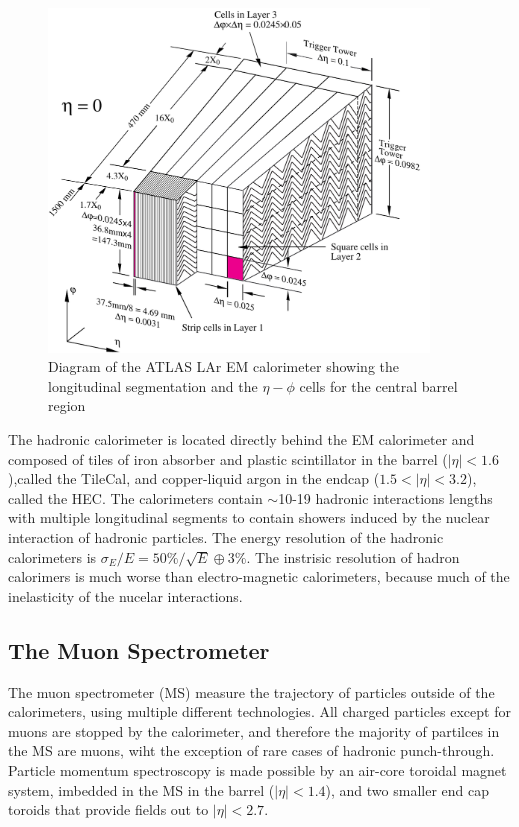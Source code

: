 \begin{figure}[!t]
\centering 
\includegraphics[width=0.9\textwidth]{figs/lhc/LARG3-TDR-barrelM-eps-converted-to}
\caption{Diagram of the ATLAS  LAr EM calorimeter showing the longitudinal segmentation and the $\eta-\phi$ cells for the central barrel region}
\label{figure:lhc_calo_em}
\end{figure}




The hadronic calorimeter is located directly behind the EM calorimeter and composed of tiles of iron absorber and plastic scintillator  in the barrel ($|\eta| < 1.6$),called the TileCal,  and copper-liquid argon in the endcap ($1.5<|\eta| <3.2$), called the HEC. The calorimeters contain $\sim$10-19 hadronic interactions lengths with multiple longitudinal segments to contain showers induced by the nuclear interaction of hadronic particles. The energy resolution of the hadronic calorimeters is $\sigma_E/E = 50\%/\sqrt{E}\oplus3\%$. The instrisic resolution of hadron calorimers is much worse than electro-magnetic calorimeters, because much of the inelasticity of the nucelar interactions. 

\subsection{The Muon Spectrometer} 

The muon spectrometer (MS) measure the trajectory of particles outside of the calorimeters, using multiple different technologies. All charged particles except for muons are stopped by the calorimeter, and therefore the majority of partilces in the MS are muons, wiht the exception of rare cases of hadronic punch-through. Particle momentum spectroscopy is made possible by an air-core toroidal magnet system, imbedded in the MS in the barrel ($|\eta| < 1.4$), and two smaller end cap toroids that provide fields out to $|\eta| < 2.7$. 

